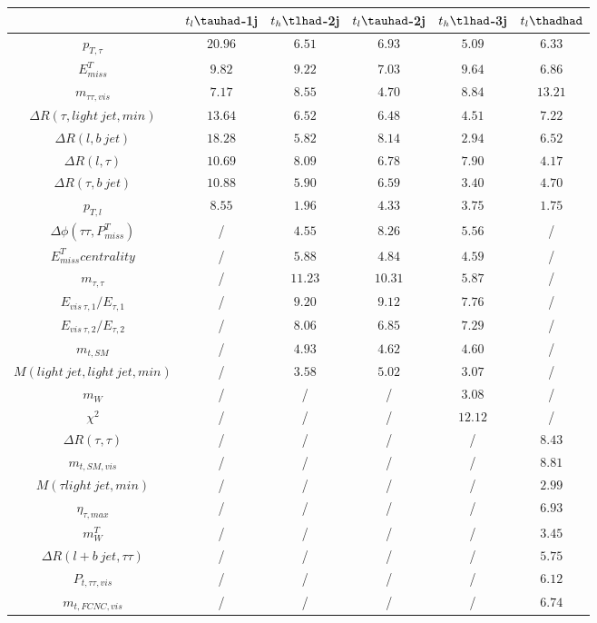 \centering
\begin{tabular}{|c|c|c|c|c|c|} \hline
 & $t_{l}\tauhad$-1j & $t_{h}\tlhad$-2j & $t_{l}\tauhad$-2j & $t_{h}\tlhad$-3j & $t_l\thadhad$\\\hline
$p_{T,\tau }$ & $20.96$ & $6.51$ & $6.93$ & $5.09$ & $6.33$\\\hline
$E^{T}_{miss}$ & $9.82$ & $9.22$ & $7.03$ & $9.64$ & $6.86$\\\hline
$m_{\tau \tau ,vis}$ & $7.17$ & $8.55$ & $4.70$ & $8.84$ & $13.21$\\\hline
$\Delta R(\tau ,light~jet,min)$ & $13.64$ & $6.52$ & $6.48$ & $4.51$ & $7.22$\\\hline
$\Delta R(l,b~jet)$ & $18.28$ & $5.82$ & $8.14$ & $2.94$ & $6.52$\\\hline
$\Delta R(l,\tau )$ & $10.69$ & $8.09$ & $6.78$ & $7.90$ & $4.17$\\\hline
$\Delta R(\tau ,b~jet)$ & $10.88$ & $5.90$ & $6.59$ & $3.40$ & $4.70$\\\hline
$p_{T,l}$ & $8.55$ & $1.96$ & $4.33$ & $3.75$ & $1.75$\\\hline
$\Delta\phi(\tau \tau ,P^{T}_{miss})$ &  / & $4.55$ & $8.26$ & $5.56$ &  /\\\hline
$E^{T}_{miss} centrality$ &  / & $5.88$ & $4.84$ & $4.59$ &  /\\\hline
$m_{\tau ,\tau }$ &  / & $11.23$ & $10.31$ & $5.87$ &  /\\\hline
$E_{vis~\tau ,1}/E_{\tau ,1}$ &  / & $9.20$ & $9.12$ & $7.76$ &  /\\\hline
$E_{vis~\tau ,2}/E_{\tau ,2}$ &  / & $8.06$ & $6.85$ & $7.29$ &  /\\\hline
$m_{t,SM}$ &  / & $4.93$ & $4.62$ & $4.60$ &  /\\\hline
$M(light~jet,light~jet,min)$ &  / & $3.58$ & $5.02$ & $3.07$ &  /\\\hline
$m_{W}$ &  / &  / &  / & $3.08$ &  /\\\hline
$\chi^{2}$ &  / &  / &  / & $12.12$ &  /\\\hline
$\Delta R(\tau ,\tau )$ &  / &  / &  / &  / & $8.43$\\\hline
$m_{t,SM,vis}$ &  / &  / &  / &  / & $8.81$\\\hline
$M(\tau  light~jet,min)$ &  / &  / &  / &  / & $2.99$\\\hline
$\eta_{\tau ,max}$ &  / &  / &  / &  / & $6.93$\\\hline
$m^{T}_{W}$ &  / &  / &  / &  / & $3.45$\\\hline
$\Delta R(l+b~jet,\tau \tau )$ &  / &  / &  / &  / & $5.75$\\\hline
$P_{t,\tau \tau ,vis}$ &  / &  / &  / &  / & $6.12$\\\hline
$m_{t,FCNC,vis}$ &  / &  / &  / &  / & $6.74$\\\hline
\end{tabular}
